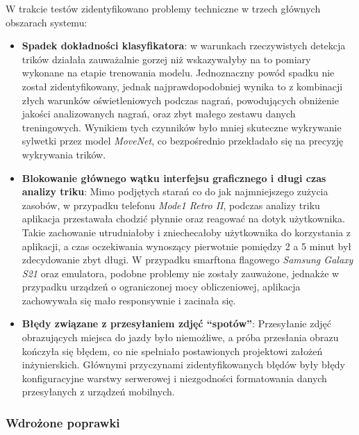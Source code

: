                 W trakcie testów zidentyfikowano problemy techniczne w trzech głównych obszarach systemu:
                \begin{itemize}
                    \item \textbf{Spadek dokładności klasyfikatora}: w warunkach rzeczywistych detekcja trików działała zauważalnie gorzej niż wskazywałyby na to pomiary wykonane na etapie trenowania modelu. Jednoznaczny powód spadku nie został zidentyfikowany, jednak najprawdopodobniej wynika to z kombinacji złych warunków oświetleniowych podczas nagrań, powodujących obniżenie jakości analizowanych nagrań, oraz zbyt małego zestawu danych treningowych. Wynikiem tych czynników było mniej skuteczne wykrywanie sylwetki przez model \textit{MoveNet}, co bezpośrednio przekładało się na precyzję wykrywania trików.
                    \item \textbf{Blokowanie głównego wątku interfejsu graficznego i długi czas analizy triku}: Mimo podjętych starań co do jak najmniejszego zużycia zasobów, w przypadku telefonu \textit{Mode1 Retro II}, podczas analizy triku aplikacja przestawała chodzić płynnie oraz reagować na dotyk użytkownika. Takie zachowanie utrudniałoby i zniechecałoby użytkownika do korzystania z aplikacji, a czas oczekiwania wynoszący pierwotnie pomiędzy 2 a 5 minut był zdecydowanie zbyt długi. W przypadku smarftona flagowego \textit{Samsung Galaxy S21} oraz emulatora, podobne problemy nie zostały zauważone, jednakże w przypadku urządzeń o ograniczonej mocy obliczeniowej, aplikacja zachowywała się mało responsywnie i zacinała się.
                    \item \textbf{Błędy związane z przesyłaniem zdjęć \enquote{spotów}}: Przesyłanie zdjęć obrazujących miejsca do jazdy było niemożliwe, a próba przesłania obrazu kończyła się błędem, co nie spełniało postawionych projektowi założeń inżynierskich. Głównymi przyczynami zidentyfikowanych błędów były błędy konfiguracyjne warstwy serwerowej i niezgodności formatowania danych przesyłanych z urządzeń mobilnych. 
                \end{itemize}

    \subsubsection{Wdrożone poprawki}

